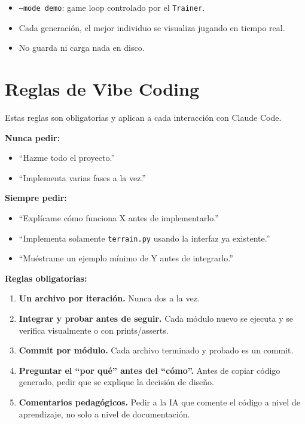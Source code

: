 \documentclass[11pt,a4paper]{article}
\begin{document}
\begin{itemize}
    \item \texttt{--mode demo}: game loop controlado por el \texttt{Trainer}.
    \item Cada generación, el mejor individuo se visualiza jugando en tiempo real.
    \item No guarda ni carga nada en disco.
\end{itemize}

\section{Reglas de Vibe Coding}

Estas reglas son obligatorias y aplican a cada interacción con Claude Code.

\textbf{Nunca pedir:}
\begin{itemize}
    \item ``Hazme todo el proyecto.''
    \item ``Implementa varias fases a la vez.''
\end{itemize}

\textbf{Siempre pedir:}
\begin{itemize}
    \item ``Explícame cómo funciona X antes de implementarlo.''
    \item ``Implementa solamente \texttt{terrain.py} usando la interfaz ya existente.''
    \item ``Muéstrame un ejemplo mínimo de Y antes de integrarlo.''
\end{itemize}

\textbf{Reglas obligatorias:}
\begin{enumerate}
    \item \textbf{Un archivo por iteración.} Nunca dos a la vez.
    \item \textbf{Integrar y probar antes de seguir.} Cada módulo nuevo se ejecuta y se verifica visualmente o con prints/asserts.
    \item \textbf{Commit por módulo.} Cada archivo terminado y probado es un commit.
    \item \textbf{Preguntar el ``por qué'' antes del ``cómo''.} Antes de copiar código generado, pedir que se explique la decisión de diseño.
    \item \textbf{Comentarios pedagógicos.} Pedir a la IA que comente el código a nivel de aprendizaje, no solo a nivel de documentación.
\end{enumerate}
\end{document}
